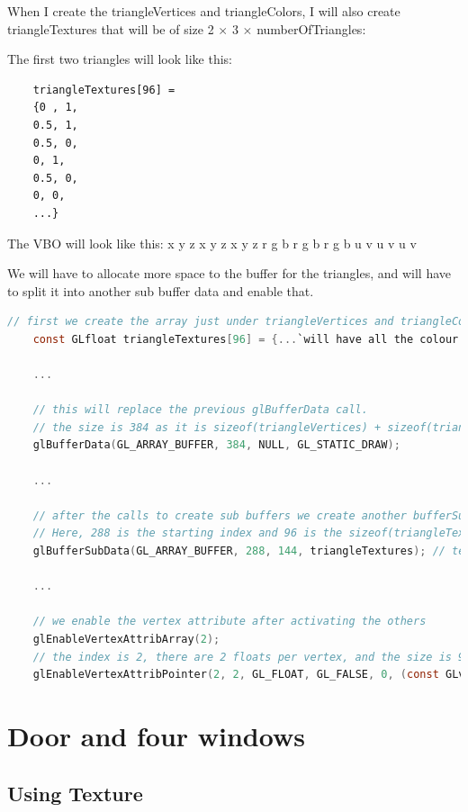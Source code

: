 \documentclass[10pt]{report}
\begin{document}
When I create the triangleVertices and triangleColors, I will also create triangleTextures that will be of size 2 $\times$ 3 $\times$ numberOfTriangles: 

The first two triangles will look like this:
\begin{verbatim}
    triangleTextures[96] = 
    {0 , 1,
    0.5, 1,
    0.5, 0,
    0, 1,
    0.5, 0,
    0, 0,
    ...}
\end{verbatim}

The VBO will look like this: x y z x y z x y z r g b r g b r g b u v u v u v 

We will have to allocate more space to the buffer for the triangles, and will have to split it into another sub buffer data and enable that.

\begin{lstlisting}[language=c]
    // first we create the array just under triangleVertices and triangleColours
    const GLfloat triangleTextures[96] = {...`will have all the colour data here as floats`...}

    ...

    // this will replace the previous glBufferData call.
    // the size is 384 as it is sizeof(triangleVertices) + sizeof(triangleColors) + sizeof(triangleTextures)
    glBufferData(GL_ARRAY_BUFFER, 384, NULL, GL_STATIC_DRAW);

    ...

    // after the calls to create sub buffers we create another bufferSubData for the textures
    // Here, 288 is the starting index and 96 is the sizeof(triangleTextures) 
    glBufferSubData(GL_ARRAY_BUFFER, 288, 144, triangleTextures); // textures

    ...

    // we enable the vertex attribute after activating the others
    glEnableVertexAttribArray(2);
    // the index is 2, there are 2 floats per vertex, and the size is 96
    glEnableVertexAttribPointer(2, 2, GL_FLOAT, GL_FALSE, 0, (const GLvoid*) 96);

\end{lstlisting}

\section{Door and four windows}

\subsection{Using Texture}
\end{document}
